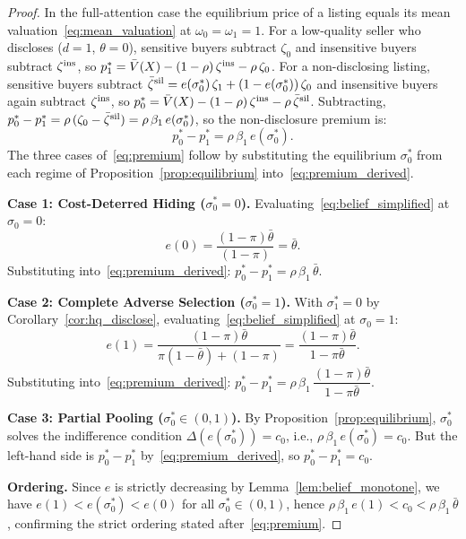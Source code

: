 \documentclass[10pt,letterpaper]{bp-template-concise}
\begin{document}
\begin{proof}
In the full-attention case the equilibrium price of a listing equals its mean valuation~\eqref{eq:mean_valuation} at $\omega_0=\omega_1=1$. For a low-quality seller who discloses ($d=1$, $\theta=0$), sensitive buyers subtract $\zeta_0$ and insensitive buyers subtract $\zeta^{\rm ins}$, so $p_1^*=\bar V(X)-(1-\rho)\,\zeta^{\rm ins}-\rho\,\zeta_0$. For a non-disclosing listing, sensitive buyers subtract $\bar\zeta^{\rm sil}=e(\sigma_0^*)\,\zeta_1+(1-e(\sigma_0^*))\,\zeta_0$ and insensitive buyers again subtract $\zeta^{\rm ins}$, so $p_0^*=\bar V(X)-(1-\rho)\,\zeta^{\rm ins}-\rho\,\bar\zeta^{\rm sil}$. Subtracting, $p_0^*-p_1^*=\rho\,(\zeta_0-\bar\zeta^{\rm sil})=\rho\,\beta_1\,e(\sigma_0^*)$, so the non-disclosure premium is:
\begin{equation}
    p_0^*-p_1^* = \rho\,\beta_1\,e(\sigma_0^*). \label{eq:premium_derived}
\end{equation}
The three cases of~\eqref{eq:premium} follow by substituting the equilibrium $\sigma_0^*$ from each regime of Proposition~\ref{prop:equilibrium} into~\eqref{eq:premium_derived}.

\medskip
\textbf{Case 1: Cost-Deterred Hiding ($\sigma_0^*=0$).}
Evaluating~\eqref{eq:belief_simplified} at $\sigma_0=0$:
\[
    e(0) = \frac{(1-\pi)\bar{\theta}}{(1-\pi)} = \bar{\theta}.
\]
Substituting into~\eqref{eq:premium_derived}: $p_0^*-p_1^* = \rho\,\beta_1\,\bar{\theta}$.

\medskip
\textbf{Case 2: Complete Adverse Selection ($\sigma_0^*=1$).}
With $\sigma_1^*=0$ by Corollary~\ref{cor:hq_disclose}, evaluating~\eqref{eq:belief_simplified} at $\sigma_0=1$:
\[
    e(1) = \frac{(1-\pi)\bar{\theta}}{\pi(1-\bar{\theta})+(1-\pi)} = \frac{(1-\pi)\bar{\theta}}{1-\pi\bar{\theta}}.
\]
Substituting into~\eqref{eq:premium_derived}: $p_0^*-p_1^* = \rho\,\beta_1\,\dfrac{(1-\pi)\bar{\theta}}{1-\pi\bar{\theta}}$.

\medskip
\textbf{Case 3: Partial Pooling ($\sigma_0^*\in(0,1)$).}
By Proposition~\ref{prop:equilibrium}, $\sigma_0^*$ solves the indifference condition $\Delta(e(\sigma_0^*))=c_0$, i.e., $\rho\,\beta_1\,e(\sigma_0^*)=c_0$. But the left-hand side is $p_0^*-p_1^*$ by~\eqref{eq:premium_derived}, so $p_0^*-p_1^*=c_0$.

\medskip
\textbf{Ordering.}
Since $e$ is strictly decreasing by Lemma~\ref{lem:belief_monotone}, we have $e(1)<e(\sigma_0^*)<e(0)$ for all $\sigma_0^*\in(0,1)$, hence $\rho\,\beta_1\,e(1)<c_0<\rho\,\beta_1\,\bar{\theta}$, confirming the strict ordering stated after~\eqref{eq:premium}.
\end{proof}
\end{document}
